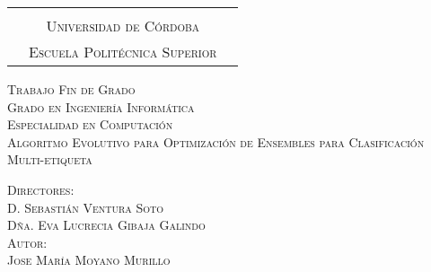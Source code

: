 \begin{titlepage}
     \begin{center}

\begin{table}[htbp]
  \centering
    \begin{tabular}{ccc}
    \multirow{3}{*}{}  & & \multirow{3}{*}{} \\
         &  \large{\textsc{Universidad de Córdoba}} \\
          &  \large{\textsc{Escuela Politécnica Superior}}
    \end{tabular}%
\end{table}%



\vspace{2cm}

\Large{\textsc{Trabajo Fin de Grado}}\\
\vspace{1cm}
\Large{\textsc{Grado en Ingeniería Informática}}\\
\large{\textsc{Especialidad en Computación}}\\

\vspace{2cm}
\LARGE{\textsc{Algoritmo Evolutivo para Optimización de Ensembles para Clasificación Multi-etiqueta}}\\
\vspace{2cm}


\end{center}

\begin{flushleft}
\large{\textsc{Directores:}}\\
\hspace{1cm} \Large{\textsc{D. Sebastián Ventura Soto}}\\
\hspace{1cm} \Large{\textsc{Dña. Eva Lucrecia Gibaja Galindo}}\\
\vspace{1cm} 
\large{\textsc{Autor:}}\\
\hspace{1cm} \Large{\textsc{Jose María Moyano Murillo}}\\
\vspace{1cm}
\end{flushleft}

\end{titlepage}

\cleardoublepage
\thispagestyle{empty}
